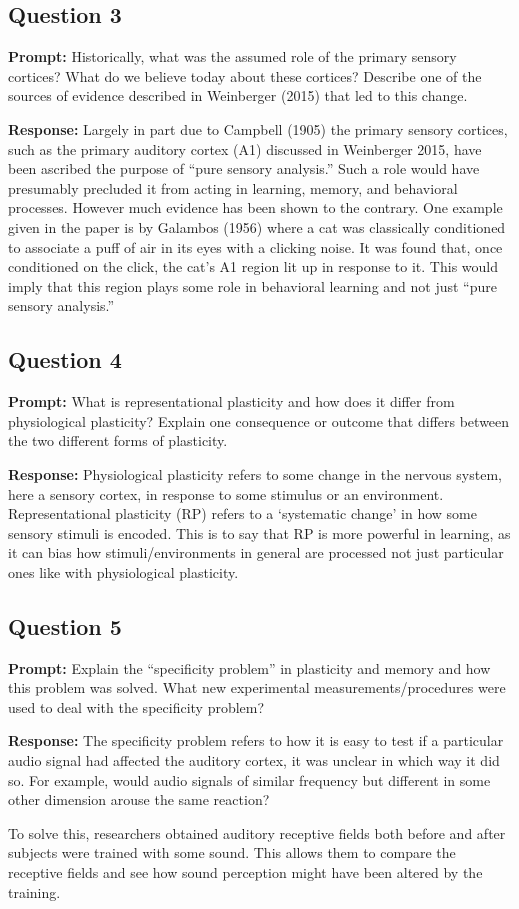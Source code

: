 \documentclass{article}
\begin{document}
\subsection*{Question 3}
\noindent\textbf{Prompt:} Historically, what was the assumed role of the primary sensory cortices? What do we believe today about these cortices? Describe one of the sources of evidence described in Weinberger (2015) that led to this change.
\bigskip

\noindent\textbf{Response:} Largely in part due to Campbell (1905) the primary sensory cortices, such as the primary auditory cortex (A1) discussed in Weinberger 2015, have been ascribed the purpose of ``pure sensory analysis.'' Such a role would have presumably precluded it from acting in learning, memory, and behavioral processes. However much evidence has been shown to the contrary. One example given in the paper is by Galambos (1956) where a cat was classically conditioned to associate a puff of air in its eyes with a clicking noise. It was found that, once conditioned on the click, the cat's A1 region lit up in response to it. This would imply that this region plays some role in behavioral learning and not just ``pure sensory analysis.''

\subsection*{Question 4}
\noindent\textbf{Prompt:} What is representational plasticity and how does it differ from physiological plasticity? Explain one consequence or outcome that differs between the two different forms of plasticity.
\bigskip

\noindent\textbf{Response:} Physiological plasticity refers to some change in the nervous system, here a sensory cortex, in response to some stimulus or an environment. Representational plasticity (RP) refers to a `systematic change' in how some sensory stimuli is encoded. This is to say that RP is more powerful in learning, as it can bias how stimuli/environments in general are processed not just particular ones like with physiological plasticity.

\subsection*{Question 5}
\noindent\textbf{Prompt:} Explain the ``specificity problem'' in plasticity and memory and how this problem was solved. What new experimental measurements/procedures were used to deal with the specificity problem?
\bigskip

\noindent\textbf{Response:} The specificity problem refers to how it is easy to test if a particular audio signal had affected the auditory cortex, it was unclear in which way it did so. For example, would audio signals of similar frequency but different in some other dimension arouse the same reaction?

To solve this, researchers obtained auditory receptive fields both before and after subjects were trained with some sound. This allows them to compare the receptive fields and see how sound perception might have been altered by the training.
\end{document}
